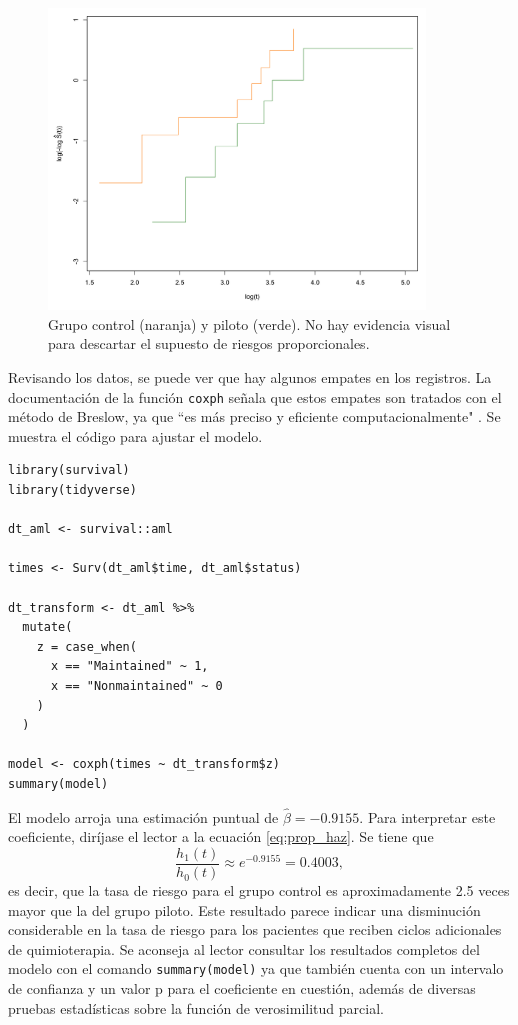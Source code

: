 \documentclass[11pt,a4paper]{article}
\begin{document}
\begin{figure}[h]
\centering\includegraphics[width=10cm]{prop_haz_km.png}
\caption{Grupo control (naranja) y piloto (verde). No hay evidencia visual para descartar el supuesto de riesgos proporcionales.}
\label{fig:coxph}
\end{figure}

Revisando los datos, se puede ver que hay algunos empates en los registros. La documentación de la función \texttt{coxph} señala que estos empates son tratados con el método de Breslow, ya que ``es más preciso y eficiente computacionalmente" \citep{survival-book}. Se muestra el código para ajustar el modelo.\\

\begin{lstlisting}
library(survival)
library(tidyverse)

dt_aml <- survival::aml

times <- Surv(dt_aml$time, dt_aml$status)

dt_transform <- dt_aml %>%
  mutate(
    z = case_when(
      x == "Maintained" ~ 1,
      x == "Nonmaintained" ~ 0
    )
  )

model <- coxph(times ~ dt_transform$z)
summary(model)
\end{lstlisting}\leavevmode\newline

El modelo arroja una estimación puntual de $\hat{\beta} = -0.9155$. Para interpretar este coeficiente, diríjase el lector a la ecuación \ref{eq:prop_haz}. Se tiene que $$\frac{h_1(t)}{h_0(t)} \approx e^{-0.9155} = 0.4003,$$ es decir, que la tasa de riesgo para el grupo control es aproximadamente 2.5 veces mayor que la del grupo piloto. Este resultado parece indicar una disminución considerable en la tasa de riesgo para los pacientes que reciben ciclos adicionales de quimioterapia. Se aconseja al lector consultar los resultados completos del modelo con el comando \texttt{summary(model)} ya que también cuenta con un intervalo de confianza y un valor p para el coeficiente en cuestión, además de diversas pruebas estadísticas sobre la función de verosimilitud parcial.\\
\end{document}
